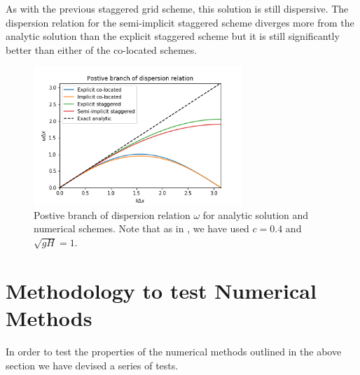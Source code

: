 \documentclass[a4paper,12pt, notitlepage]{article}
\begin{document}
As with the previous staggered grid scheme, this solution is still dispersive. The dispersion relation for the semi-implicit staggered scheme diverges more from the analytic solution than the explicit staggered scheme but it is still significantly better than either of the co-located schemes. 

\begin{figure}
	\centering
	\includegraphics[width=0.7\textwidth]{dispersion_relations.png}
	\caption{Postive branch of dispersion relation $\omega$ for analytic solution and numerical schemes. Note that as in \cite{MPE textbook}, we have used $c=0.4$ and $\sqrt{gH} = 1$.} \label{dispersionfigure}
\end{figure}

\section{Methodology to test Numerical Methods}
In order to test the properties of the numerical methods outlined in the above section we have devised a series of tests.
\end{document}
